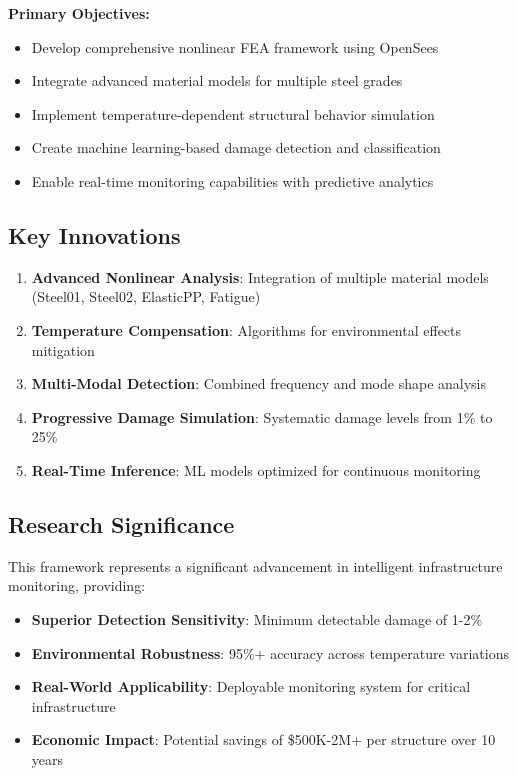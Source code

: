 \documentclass[12pt,a4paper]{article}
\begin{document}
\textbf{Primary Objectives:}
\begin{itemize}
    \item Develop comprehensive nonlinear FEA framework using OpenSees
    \item Integrate advanced material models for multiple steel grades
    \item Implement temperature-dependent structural behavior simulation
    \item Create machine learning-based damage detection and classification
    \item Enable real-time monitoring capabilities with predictive analytics
\end{itemize}

\subsection{Key Innovations}

\begin{enumerate}
    \item \textbf{Advanced Nonlinear Analysis}: Integration of multiple material models (Steel01, Steel02, ElasticPP, Fatigue)
    \item \textbf{Temperature Compensation}: Algorithms for environmental effects mitigation
    \item \textbf{Multi-Modal Detection}: Combined frequency and mode shape analysis
    \item \textbf{Progressive Damage Simulation}: Systematic damage levels from 1\% to 25\%
    \item \textbf{Real-Time Inference}: ML models optimized for continuous monitoring
\end{enumerate}

\subsection{Research Significance}

This framework represents a significant advancement in intelligent infrastructure monitoring, providing:
\begin{itemize}
    \item \textbf{Superior Detection Sensitivity}: Minimum detectable damage of 1-2\%
    \item \textbf{Environmental Robustness}: 95\%+ accuracy across temperature variations
    \item \textbf{Real-World Applicability}: Deployable monitoring system for critical infrastructure
    \item \textbf{Economic Impact}: Potential savings of \$500K-2M+ per structure over 10 years
\end{itemize}
\end{document}
